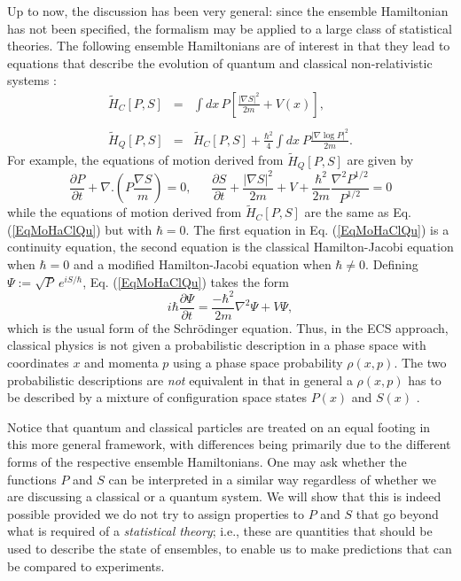 \documentclass [12pt]{revtex4}
\begin{document}
Up to now, the discussion has been very general: since the ensemble Hamiltonian has not been specified, the formalism may be applied to a large class of statistical theories. The following ensemble Hamiltonians are of interest in that they lead to equations that describe the evolution of quantum and classical non-relativistic systems \cite{HR2005}:
\begin{eqnarray}\label{HaClQu}
\tilde{H}_C[P,S] &=& \int dx\, P \left[ \frac{|\nabla S|^2}{2m} + V(x)\right] ,\\ \nonumber
{~} \\
\tilde{H}_Q[P,S] &=& \tilde{H}_C[P,S]
+  \frac{\hbar^2}{4} \int dx\ P\frac{|\nabla \log P|^2}{2m} .
\end{eqnarray}
For example, the equations of motion derived from $\tilde{H}_Q[P,S]$ are given by
\begin{equation}\label{EqMoHaClQu}
\frac{\partial P}{\partial t} + \nabla .\left( P\frac{\nabla S}{m} \right) =0,~~~~~~~\frac{\partial S}{\partial t} + \frac{|\nabla S|^2}{2m} + V +  \frac{\hbar^2}{2m}\frac{\nabla^2 P^{1/2}}{P^{1/2}} = 0
\end{equation}
while the equations of motion derived from $\tilde{H}_C[P,S]$ are the same as Eq. (\ref{EqMoHaClQu}) but with $\hbar=0$. The first equation in Eq. (\ref{EqMoHaClQu}) is a continuity equation, the second equation is the classical Hamilton-Jacobi equation when $\hbar = 0$ and a modified Hamilton-Jacobi equation when $\hbar \neq 0$. Defining $\Psi:=\sqrt{P}~e^{iS/\hbar}$, Eq. (\ref{EqMoHaClQu}) takes the form
\begin{equation}\nonumber
i\hbar \frac{\partial \Psi}{\partial t}
= \frac{-\hbar^2}{2m}\nabla^2\Psi + V\Psi,
\end{equation}
which is the usual form of the Schr\"{o}dinger equation. Thus, in the ECS approach,
classical physics is not given a probabilistic description
in a phase space with coordinates $x$ and momenta $p$ using a phase space probability
$\rho(x,p)$. The two probabilistic descriptions are {\it not} equivalent in that in
general a $\rho(x,p)$ has to be described by a mixture of configuration space states
$P(x)$ and $S(x)$ \cite{L1952, RH2009}.

Notice that quantum and classical particles are treated on an equal footing in this more general framework, with differences being primarily due to the different forms of the respective ensemble Hamiltonians. One may ask whether the functions $P$ and $S$ can be interpreted in a similar way regardless of whether we are discussing a classical or a quantum system. We will show that this is indeed possible provided we do not try to assign properties to $P$ and $S$ that go beyond what is required of a {\it statistical theory}; i.e., these are quantities that should be used to describe the state of ensembles, to enable us to make predictions that can be compared to experiments.
\end{document}
